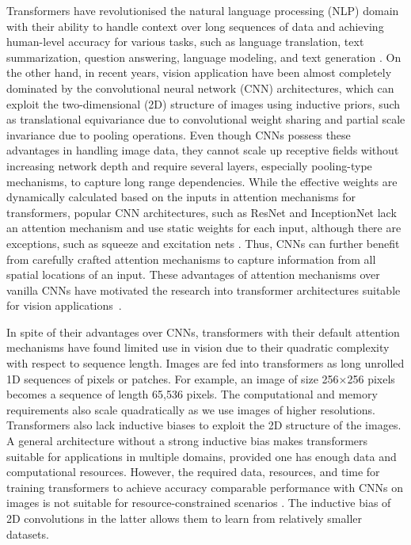 \documentclass{article}
\begin{document}
Transformers have revolutionised the natural language processing (NLP) domain with their ability to handle context over long sequences of data and achieving human-level accuracy for various tasks, such as language translation, text summarization, question answering, language modeling, and text generation \cite{vaswani2017attention,devlin2019bert}. On the other hand, in recent years, vision application have been almost completely dominated by the convolutional neural network (CNN) architectures, which can exploit the two-dimensional (2D) structure of images using inductive priors, such as translational equivariance due to convolutional weight sharing and partial scale invariance due to pooling operations. Even though CNNs possess these advantages in handling image data, they cannot scale up receptive fields without increasing network depth and require several layers, especially pooling-type mechanisms, to capture long range dependencies. While the effective weights are dynamically calculated based on the inputs in attention mechanisms for transformers, popular CNN architectures, such as ResNet \cite{he2015deep} and InceptionNet \cite{szegedy2014going} lack an attention mechanism and use static weights for each input, although there are exceptions, such as squeeze and excitation nets \cite{iandola2016squeezenet,hu2019squeezeandexcitation}. Thus, CNNs can further benefit from carefully crafted attention mechanisms to capture information from all spatial locations of an input. These advantages of attention mechanisms over vanilla CNNs have motivated the research into transformer architectures suitable for vision applications~\cite{khan2021transformers}.

In spite of their advantages over CNNs, transformers with their default attention mechanisms have found limited use in vision due to their quadratic complexity with respect to sequence length. Images are fed into transformers as long unrolled 1D sequences of pixels or patches. For example, an image of size 256×256 pixels becomes a sequence of length 65,536 pixels. The computational and memory requirements also scale quadratically as we use images of higher resolutions. Transformers also lack inductive biases to exploit the 2D structure of the images. A general architecture without a strong inductive bias makes transformers suitable for applications in multiple domains, provided one has enough data and computational resources. However, the required data, resources, and time for training transformers to achieve accuracy comparable performance with CNNs on images is not suitable for resource-constrained scenarios \cite{khan2021transformers}. The inductive bias of 2D convolutions in the latter allows them to learn from relatively smaller datasets.
\end{document}
